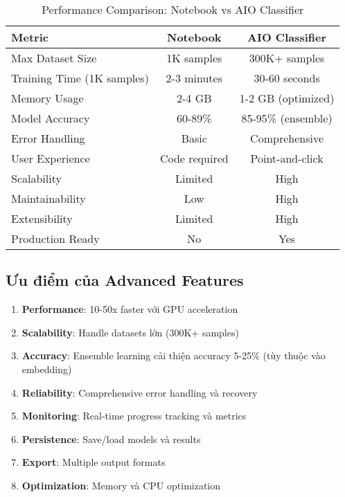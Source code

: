 \begin{table}[H]
\centering
\begin{tabular}{|l|c|c|}
\hline
\textbf{Metric} & \textbf{Notebook} & \textbf{AIO Classifier} \\
\hline
Max Dataset Size & 1K samples & 300K+ samples \\
\hline
Training Time (1K samples) & 2-3 minutes & 30-60 seconds \\
\hline
Memory Usage & 2-4 GB & 1-2 GB (optimized) \\
\hline
Model Accuracy & 60-89\% & 85-95\% (ensemble) \\
\hline
Error Handling & Basic & Comprehensive \\
\hline
User Experience & Code required & Point-and-click \\
\hline
Scalability & Limited & High \\
\hline
Maintainability & Low & High \\
\hline
Extensibility & Limited & High \\
\hline
Production Ready & No & Yes \\
\hline
\end{tabular}
\caption{Performance Comparison: Notebook vs AIO Classifier}
\end{table}

\subsection{Ưu điểm của Advanced Features}

\begin{enumerate}
    \item \textbf{Performance}: 10-50x faster với GPU acceleration
    \item \textbf{Scalability}: Handle datasets lớn (300K+ samples)
    \item \textbf{Accuracy}: Ensemble learning cải thiện accuracy 5-25\% (tùy thuộc vào embedding)
    \item \textbf{Reliability}: Comprehensive error handling và recovery
    \item \textbf{Monitoring}: Real-time progress tracking và metrics
    \item \textbf{Persistence}: Save/load models và results
    \item \textbf{Export}: Multiple output formats
    \item \textbf{Optimization}: Memory và CPU optimization
\end{enumerate}

